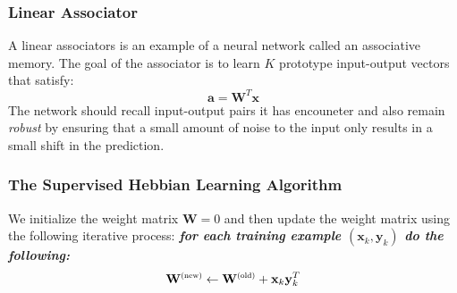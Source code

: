 \subsubsection{Linear Associator}
A linear associators is an example of a neural network called an associative memory. The goal of the associator is to learn \(K\) prototype input-output vectors that satisfy:
\[\mathbf{a}=\mathbf{W}^T\mathbf{x}\]
The network should recall input-output pairs it has encouneter and also remain \emph{robust} by ensuring that a small amount of noise to the input only results in a small shift in the prediction.
\subsubsection{The Supervised Hebbian Learning Algorithm}
We initialize the weight matrix \(\mathbf{W}=0\) and then update the weight matrix using the following iterative process:
\emph{\textbf{for each training example \((\mathbf{x}_k,\mathbf{y}_k)\) do the following:}}
\[
    \mathbf{W}^{{\scaleto{(\text{new})}{6pt}}}\gets\mathbf{W}^{{\scaleto{(\text{old})}{6pt}}}+\mathbf{x}_k\mathbf{y}_k^T    
\]